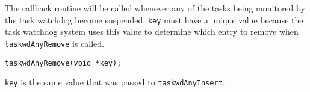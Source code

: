 \begin{enumerate}
The callback routine will be called whenever any of the tasks being monitored by the task watchdog become 
suspended. \verb|key| must have a unique value because the task watchdog system uses this value to determine which 
entry to remove when \verb|taskwdAnyRemove| is called.

\begin{verbatim}
taskwdAnyRemove(void *key);
\end{verbatim}

\verb|key| is the same value that was passed to \verb|taskwdAnyInsert|.
\end{enumerate}
